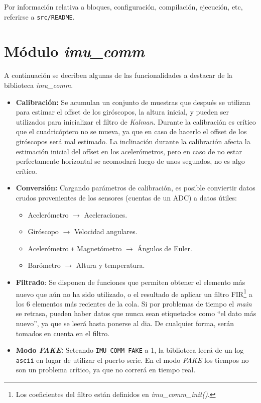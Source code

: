 \documentclass[main]{subfiles}
\begin{document}
Por información relativa a bloques, configuración, compilación, ejecución, etc, referirse a \verb+src/README+.

\section{M\'odulo \textit{imu\_comm}}
\label{sec:software:imu-comm}

A continuaci\'on se decriben algunas de las funcionalidades a destacar de la biblioteca \textit{imu\_comm}.

\begin{itemize}
\item \textbf{Calibración:} Se acumulan un conjunto de muestras que después se utilizan para estimar el offset de los giróscopos, la altura inicial, y pueden ser utilizados para inicializar el filtro de \textit{Kalman}. Durante la calibraci\'on es cr\'itico que el cuadric\'optero no se mueva, ya que en caso de hacerlo el offset de los gir\'oscopos ser\'a mal estimado.\newline
La inclinaci\'on durante la calibraci\'on afecta la estimaci\'on inicial del offset en los aceler\'ometros, pero en caso de no estar perfectamente horizontal se acomodar\'a luego de unos segundos, no es algo cr\'itico.
\item \textbf{Conversión:} Cargando parámetros de calibración, es posible conviertir datos crudos provenientes de los sensores (cuentas de un ADC) a datos útiles:
  \begin{itemize}
  \item Aceler\'ometro $\rightarrow$ Aceleraciones.
  \item Gir\'oscopo $\rightarrow$ Velocidad angulares.
  \item Aceler\'ometro \verb~+~ Magnet\'ometro  $\rightarrow$ \'Angulos de Euler.
  \item Bar\'ometro $\rightarrow$ Altura y temperatura.
  \end{itemize}

\item \textbf{Filtrado}: Se disponen de funciones que permiten obtener el elemento m\'as nuevo que a\'un no ha sido utilizado, o el resultado de aplicar un filtro FIR\footnote{Los coeficientes del filtro est\'an definidos en \textit{imu\_comm\_init()}.} a los 6 elementos m\'as recientes de la cola. Si por problemas de tiempo el \textit{main} se retrasa, pueden haber datos que nunca sean etiquetados como ``el dato m\'as nuevo'', ya que se leer\'a hasta ponerse al dia. De cualquier forma, ser\'an tomados en cuenta en el filtro.

\item \textbf{Modo \textit{FAKE}:} Seteando \verb+IMU_COMM_FAKE+ a 1, la biblioteca leerá de un log \verb+ascii+ en lugar de utilizar el puerto serie. En el modo \textit{FAKE} los tiempos no son un problema cr\'itico, ya que no correr\'a en tiempo real.
\end{itemize}
\end{document}
